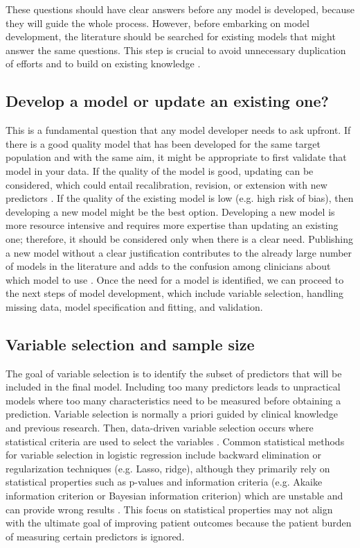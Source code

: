 These questions should have clear answers before any model is developed, because they will guide the whole process. However, before embarking on model development, the literature should be searched for existing models that might answer the same questions. This step is crucial to avoid unnecessary duplication of efforts and to build on existing knowledge \cite{smitsImprovingHealthCare2026}. 

\subsection{Develop a model or update an existing one?}

This is a fundamental question that any model developer needs to ask upfront. If there is a good quality model that has been developed for the same target population and with the same aim, it might be appropriate to first validate that model in your data. If the quality of the model is good, updating can be considered, which could entail recalibration, revision, or extension with new predictors \cite{vancalsterValidationUpdatingRisk2017,steyerberg2019clinical}. If the quality of the existing model is low (e.g. high risk of bias), then developing a new model might be the best option. Developing a new model is more resource intensive and requires more expertise than updating an existing one; therefore, it should be considered only when there is a clear need. Publishing a new model without a clear justification contributes to the already large number of models in the literature and adds to the confusion among clinicians about which model to use \cite{arshiNumberPublicationsNew2025}. Once the need for a model is identified, we can proceed to the next steps of model development, which include variable selection, handling missing data, model specification and fitting, and validation.

\subsection{Variable selection and sample size}

The goal of variable selection is to identify the subset of predictors that will be included in the final model. Including too many predictors leads to unpractical models where too many characteristics need to be measured before obtaining a prediction. Variable selection is normally a priori guided by clinical knowledge and previous research. Then, data-driven variable selection occurs where statistical criteria are used to select the variables \cite{heinzeVariableSelectionReview2018}. Common statistical methods for variable selection in logistic regression include backward elimination or regularization techniques (e.g. Lasso, ridge), although they primarily rely on statistical properties such as p-values and information criteria (e.g. Akaike information criterion or Bayesian information criterion) which are unstable and can provide wrong results \cite{heinzeFiveMythsVariable2017}. This focus on statistical properties may not align with the ultimate goal of improving patient outcomes because the patient burden of measuring certain predictors is ignored. 

